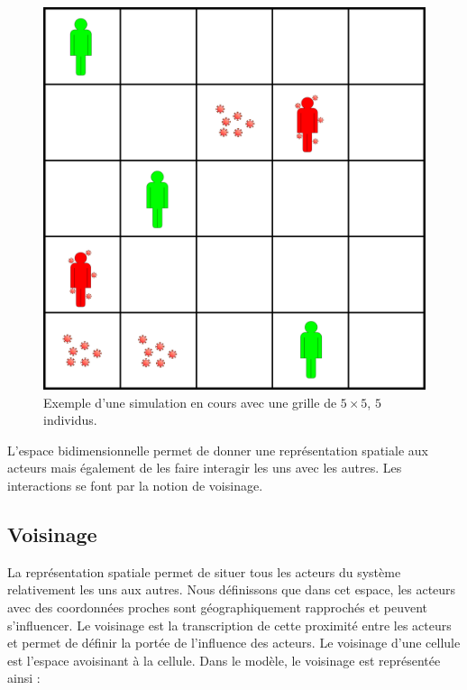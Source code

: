 \begin{figure}[h]
	\centering
	\captionsetup{justification=centering}
	\includegraphics[scale=0.5]{Images/grid.png}
	\caption[Grille régulière]{Exemple d'une simulation en cours avec une grille de $5\times 5$, $5$ individus.}
\end{figure}

L'espace bidimensionnelle permet de donner une représentation spatiale aux acteurs mais également de les faire interagir les uns avec les autres. Les interactions se font par la notion de voisinage.

\newpage

\subsection{Voisinage}

La représentation spatiale permet de situer tous les acteurs du système relativement les uns aux autres. Nous définissons que dans cet espace, les acteurs avec des coordonnées proches sont géographiquement rapprochés et peuvent s'influencer. Le voisinage est la transcription de cette proximité entre les acteurs et permet de définir la portée de l'influence des acteurs. Le voisinage d'une cellule est l'espace avoisinant à la cellule. Dans le modèle, le voisinage est représentée ainsi :\\

